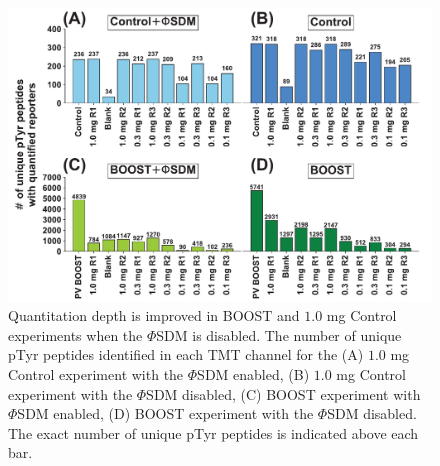 \documentclass[journal=jprobs,manuscript=article]{achemso}
\begin{document}
\begin{figure}[!h]
\centering
\includegraphics[width=150mm]{figures/main_figs/depth_nans.pdf}
\caption{Quantitation depth is improved in BOOST and $1.0$ mg Control experiments when the $\Phi$SDM is disabled. The number of unique pTyr peptides identified in each TMT channel for the (A) $1.0$ mg Control experiment with the $\Phi$SDM enabled, (B) $1.0$ mg Control experiment with the $\Phi$SDM disabled, (C) BOOST experiment with $\Phi$SDM enabled, (D) BOOST experiment with the $\Phi$SDM disabled. The exact number of unique pTyr peptides is indicated above each bar. }\label{depth_nans}
\end{figure}
\end{document}
